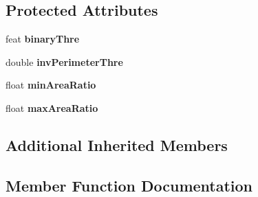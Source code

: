 \subsection*{Protected Attributes}
\begin{DoxyCompactItemize}
\item 
\hypertarget{classBKGCutDetector_ad1f1988badcfe3f8b6341e0ad7d40e9c}{}feat {\bfseries binary\+Thre}\label{classBKGCutDetector_ad1f1988badcfe3f8b6341e0ad7d40e9c}

\item 
\hypertarget{classBKGCutDetector_a51de970ae40887927077e27092b3d2f4}{}double {\bfseries inv\+Perimeter\+Thre}\label{classBKGCutDetector_a51de970ae40887927077e27092b3d2f4}

\item 
\hypertarget{classBKGCutDetector_a2184787ed50fbe8f30d1a8ef88cb3cc3}{}float {\bfseries min\+Area\+Ratio}\label{classBKGCutDetector_a2184787ed50fbe8f30d1a8ef88cb3cc3}

\item 
\hypertarget{classBKGCutDetector_aea66427f38ba877edf1cac44a242c797}{}float {\bfseries max\+Area\+Ratio}\label{classBKGCutDetector_aea66427f38ba877edf1cac44a242c797}

\end{DoxyCompactItemize}
\subsection*{Additional Inherited Members}


\subsection{Member Function Documentation}
\hypertarget{classBKGCutDetector_a2d0179ff253ad09c1549c8437e07736f}{}
